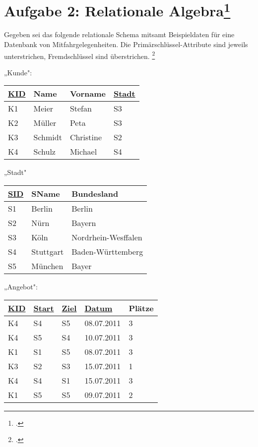 \documentclass{lehramt-informatik}
\def\TmpUeber#1{{\setul{-0.9em}{}\ul{#1}}}
\begin{document}
\section{Aufgabe 2: Relationale Algebra\footcite{db:pu:wh}}

Gegeben sei das folgende relationale Schema mitsamt Beispieldaten für
eine Datenbank von Mitfahrgelegenheiten. Die Primärschlüssel-Attribute
sind jeweils unterstrichen, Fremdschlüssel sind überstrichen.
\footcite[DB/ST - Frühjahr 2014 (nicht vertieft -46116), Thema 2, A2]{examen:46116:2014:03}

{
\footnotesize
\begin{multicols}{2}
„Kunde":

\begin{tabular}{|l|l|l|l|}
\hline
\ul{KID} & Name & Vorname & \TmpUeber{Stadt}\\\hline\hline
K1 & Meier & Stefan & S3\\\hline
K2 & Müller & Peta & S3\\\hline
K3 & Schmidt & Christine & S2\\\hline
K4 & Schulz & Michael & S4\\\hline
\end{tabular}

„Stadt"

\begin{tabular}{|l|l|l|}
\hline
\ul{SID} & SName & Bundesland\\\hline\hline
S1 & Berlin & Berlin\\\hline
S2 & Nürn & Bayern\\\hline
S3 & Köln & Nordrhein-Wesffalen\\\hline
S4 & Stuttgart & Baden-Württemberg\\\hline
S5 & München & Bayer\\\hline
\end{tabular}
\end{multicols}

\begin{multicols}{2}
„Angebot":

\begin{tabular}{|l|l|l|l|l|}
\hline
\ul{KID} & \TmpUeber{Start} & \TmpUeber{Ziel} & \ul{Datum} & Plätze\\\hline\hline
K4 & S4 & S5 & 08.07.2011 & 3\\\hline
K4 & S5 & S4 & 10.07.2011 & 3\\\hline
K1 & S1 & S5 & 08.07.2011 & 3\\\hline
K3 & S2 & S3 & 15.07.2011 & 1\\\hline
K4 & S4 & S1 & 15.07.2011 & 3\\\hline
K1 & S5 & S5 & 09.07.2011 & 2\\\hline
\end{tabular}


\end{multicols}}
\end{document}
